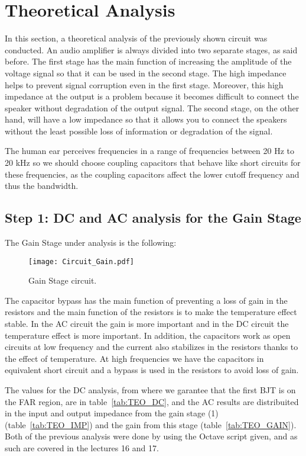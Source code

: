 \section{Theoretical Analysis}
\label{sec:analysis}

In this section, a theoretical analysis of the previously shown circuit was conducted. 
An audio amplifier is always divided into two separate stages, as said before. The first stage has the main function of increasing the amplitude of the voltage signal so that it can be used in the second stage. The high impedance helps to prevent signal corruption even in the first stage. Moreover, this high impedance at the output is a problem because it becomes difficult to connect the speaker without degradation of the output signal. The second stage, on the other hand, will have a low impedance so that it allows you to connect the speakers without the least possible loss of information or degradation of the signal. \par
The human ear perceives frequencies in a range of frequencies between 20 Hz to 20 kHz so we should choose coupling capacitors that behave like short circuits for these frequencies, as the coupling capacitors affect the lower cutoff frequency and thus the bandwidth.

\subsection{Step 1: DC and AC analysis for the Gain Stage}

The Gain Stage under analysis is the following:

\begin{figure}[h] \centering
\texttt{[image: Circuit\_Gain.pdf]}
\caption{Gain Stage circuit.}
\label{fig:GAIN_CIR}
\end{figure}

The capacitor bypass has the main function of preventing a loss of gain in the resistors and the main function of the resistors is to make the temperature effect stable. In the AC circuit the gain is more important and in the DC circuit the temperature effect is more important. In addition, the capacitors work as open circuits at low frequency and the current also stabilizes in the resistors thanks to the effect of temperature. At high frequencies we have the capacitors in equivalent short circuit and a bypass is used in the resistors to avoid loss of gain. \par
The values for the DC analysis, from where we garantee that the first BJT is on the FAR region, are in table~\ref{tab:TEO_DC}, and the AC results are distribuited in the input and output impedance from the gain stage (1) (table~\ref{tab:TEO_IMP}) and the gain from this stage (table~\ref{tab:TEO_GAIN}).
Both of the previous analysis were done by using the Octave script given, and as such are covered in the lectures 16 and 17.

